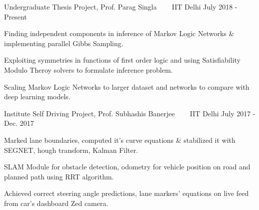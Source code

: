 


\begin{cventries}

  
  \cventry
  {Undergraduate Thesis Project, Prof. Parag Singla}
  {\href{https://github.com/saketdingliwal/MLN-Inference-Task}{}
    \ \ \ \normalfont\href{https://github.com/saketdingliwal/MLN-Inference-Task}
    {}}
  {IIT Delhi}
  {July 2018 - Present}
  {
    \begin{cvitems}
    \item Finding independent components in inference of Markov Logic Networks \& implementing parallel Gibbs Sampling.
    \item Exploiting symmetries in functions of first order logic and using Satisfiability Modulo Theroy solvers to formulate inference problem.
    \item Scaling Markov Logic Networks to larger dataset and networks to compare with deep learning models.
    \end{cvitems}
  }

  \cventry
  {Institute Self Driving Project, Prof. Subhashis Banerjee}
  {\href{https://github.com/AniketBajpai/AutoNav2}{}
    \ \ \ \normalfont\href{https://github.com/AniketBajpai/AutoNav2}
    {}}
  {IIT Delhi}
  {July 2017 - Dec. 2017}
  {
    \begin{cvitems}
    \item Marked lane boundaries, computed it's curve equations \& stabilized it with SEGNET, hough transform, Kalman Filter.
    \item SLAM Module for obstacle detection, odometry for         vehicle position on road and planned path using RRT         algorithm.
    \item Achieved correct steering angle predictions, lane markers' equations on live feed from car's dashboard Zed camera.
    \end{cvitems}
  }


\end{cventries}
